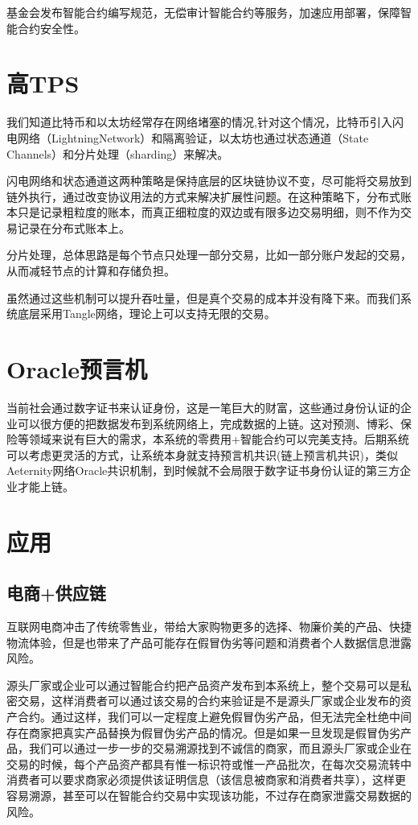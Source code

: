 \documentclass[UTF8]{ctexart}
\begin{document}
基金会发布智能合约编写规范，无偿审计智能合约等服务，加速应用部署，保障智能合约安全性。

\section{高TPS}

我们知道比特币和以太坊经常存在网络堵塞的情况,针对这个情况，比特币引入闪电网络（LightningNetwork）和隔离验证，以太坊也通过状态通道（State Channels）和分片处理（sharding）来解决。

闪电网络和状态通道这两种策略是保持底层的区块链协议不变，尽可能将交易放到链外执行，通过改变协议用法的方式来解决扩展性问题。在这种策略下，分布式账本只是记录粗粒度的账本，而真正细粒度的双边或有限多边交易明细，则不作为交易记录在分布式账本上。

分片处理，总体思路是每个节点只处理一部分交易，比如一部分账户发起的交易，从而减轻节点的计算和存储负担。

虽然通过这些机制可以提升吞吐量，但是真个交易的成本并没有降下来。而我们系统底层采用Tangle网络，理论上可以支持无限的交易。

\section{Oracle预言机}

当前社会通过数字证书来认证身份，这是一笔巨大的财富，这些通过身份认证的企业可以很方便的把数据发布到系统网络上，完成数据的上链。这对预测、博彩、保险等领域来说有巨大的需求，本系统的零费用+智能合约可以完美支持。后期系统可以考虑更灵活的方式，让系统本身就支持预言机共识(链上预言机共识)，类似Aeternity网络Oracle共识机制，到时候就不会局限于数字证书身份认证的第三方企业才能上链。

\section{应用}

\subsection{电商+供应链} 互联网电商冲击了传统零售业，带给大家购物更多的选择、物廉价美的产品、快捷物流体验，但是也带来了产品可能存在假冒伪劣等问题和消费者个人数据信息泄露风险。

源头厂家或企业可以通过智能合约把产品资产发布到本系统上，整个交易可以是私密交易，这样消费者可以通过该交易的合约来验证是不是源头厂家或企业发布的资产合约。通过这样，我们可以一定程度上避免假冒伪劣产品，但无法完全杜绝中间存在商家把真实产品替换为假冒伪劣产品的情况。但是如果一旦发现是假冒伪劣产品，我们可以通过一步一步的交易溯源找到不诚信的商家，而且源头厂家或企业在交易的时候，每个产品资产都具有惟一标识符或惟一产品批次，在每次交易流转中消费者可以要求商家必须提供该证明信息（该信息被商家和消费者共享），这样更容易溯源，甚至可以在智能合约交易中实现该功能，不过存在商家泄露交易数据的风险。
\end{document}
